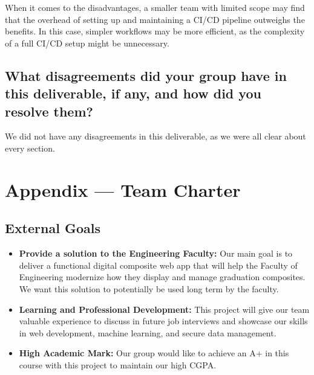 \documentclass{article}
\begin{document}
When it comes to the disadvantages, a smaller team with limited scope may find that the overhead of setting up and maintaining a CI/CD pipeline outweighs the benefits. In this case, simpler workflows may be more efficient, as the complexity of a full CI/CD setup might be unnecessary.

\subsection*{What disagreements did your group have in this deliverable, if any, and how did you resolve them?}
We did not have any disagreements in this deliverable, as we were all clear about every section.


\newpage{}

\section*{Appendix --- Team Charter}


\subsection*{External Goals}

\begin{itemize}
    \item \textbf{Provide a solution to the Engineering Faculty:}  
    Our main goal is to deliver a functional digital composite web app that will help the Faculty of Engineering modernize how they display and manage graduation composites. We want this solution to potentially be used long term by the faculty.

    \item \textbf{Learning and Professional Development:}  
    This project will give our team valuable experience to discuss in future job interviews and showcase our skills in web development, machine learning, and secure data management.

    \item \textbf{High Academic Mark:}  
    Our group would like to achieve an A+ in this course with this project to maintain our high CGPA.
\end{itemize}
\end{document}
